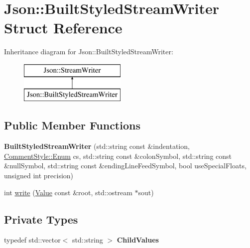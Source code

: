 \hypertarget{struct_json_1_1_built_styled_stream_writer}{}\section{Json\+:\+:Built\+Styled\+Stream\+Writer Struct Reference}
\label{struct_json_1_1_built_styled_stream_writer}
Inheritance diagram for Json\+:\+:Built\+Styled\+Stream\+Writer\+:\begin{figure}[H]
\begin{center}
\leavevmode
\includegraphics[height=2.000000cm]{struct_json_1_1_built_styled_stream_writer}
\end{center}
\end{figure}
\subsection*{Public Member Functions}
\begin{DoxyCompactItemize}
\item 
\hypertarget{struct_json_1_1_built_styled_stream_writer_ab0c2e665c86b22f8fafb0e52c8069954}{}{\bfseries Built\+Styled\+Stream\+Writer} (std\+::string const \&indentation, \hyperlink{struct_json_1_1_comment_style_a51fc08f3518fd81eba12f340d19a3d0c}{Comment\+Style\+::\+Enum} cs, std\+::string const \&colon\+Symbol, std\+::string const \&null\+Symbol, std\+::string const \&ending\+Line\+Feed\+Symbol, bool use\+Special\+Floats, unsigned int precision)\label{struct_json_1_1_built_styled_stream_writer_ab0c2e665c86b22f8fafb0e52c8069954}

\item 
int \hyperlink{struct_json_1_1_built_styled_stream_writer_ab8810d938c35c8442cbffcd001628cd0}{write} (\hyperlink{class_json_1_1_value}{Value} const \&root, std\+::ostream $\ast$sout)
\end{DoxyCompactItemize}
\subsection*{Private Types}
\begin{DoxyCompactItemize}
\item 
\hypertarget{struct_json_1_1_built_styled_stream_writer_a8356597862a354bcd55a7cb6e0512899}{}typedef std\+::vector$<$ std\+::string $>$ {\bfseries Child\+Values}\label{struct_json_1_1_built_styled_stream_writer_a8356597862a354bcd55a7cb6e0512899}

\end{DoxyCompactItemize}
